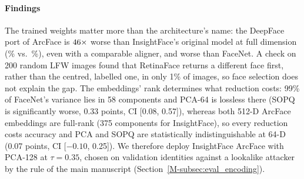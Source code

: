\documentclass[10pt,letterpaper,journal]{IEEEtran}
\begin{document}
\begin{table}[h]
\centering
\caption{LFW EER (\%) with 95\% Pair-Bootstrap CIs, Same Pairs for All Rows}
\label{tab:supp-face-models}
\setlength{\tabcolsep}{3pt}
\end{table}

\paragraph{Findings} The trained weights matter more than the architecture's name: the DeepFace port of ArcFace is $46\times$ worse than InsightFace's original model at full dimension (\nDeepfaceEer\% vs.\ \nRawEer\%), even with a comparable aligner, and worse than FaceNet. A check on 200 random LFW images found that RetinaFace returns a different face first, rather than the centred, labelled one, in only 1\% of images, so face selection does not explain the gap. The embeddings' rank determines what reduction costs: 99\% of FaceNet's variance lies in 58 components and PCA-64 is lossless there (SOPQ is significantly worse, 0.33 points, CI [0.08, 0.57]), whereas both 512-D ArcFace embeddings are full-rank (375 components for InsightFace), so every reduction costs accuracy and PCA and SOPQ are statistically indistinguishable at 64-D (0.07 points, CI [$-0.10$, 0.25]). We therefore deploy InsightFace ArcFace with PCA-128 at $\tau = 0.35$, chosen on validation identities against a lookalike attacker by the rule of the main manuscript (Section~\ref{M-subsec:eval_encoding}).



\end{document}
